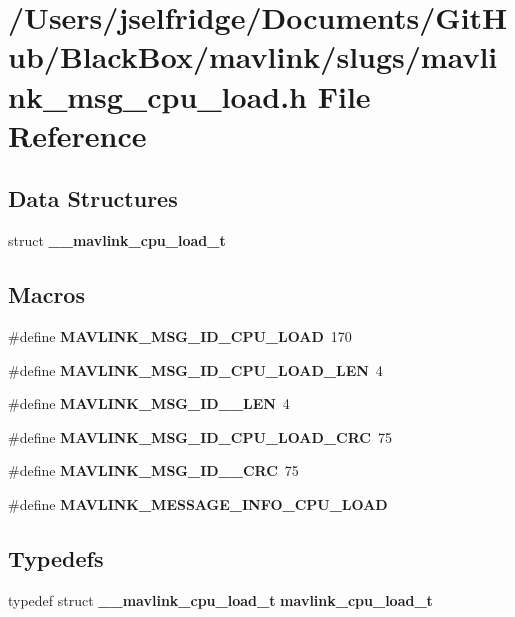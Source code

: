 \section{/\+Users/jselfridge/\+Documents/\+Git\+Hub/\+Black\+Box/mavlink/slugs/mavlink\+\_\+msg\+\_\+cpu\+\_\+load.h File Reference}
\label{mavlink__msg__cpu__load_8h}
\subsection*{Data Structures}
\begin{DoxyCompactItemize}
\item 
struct \textbf{ \+\_\+\+\_\+mavlink\+\_\+cpu\+\_\+load\+\_\+t}
\end{DoxyCompactItemize}
\subsection*{Macros}
\begin{DoxyCompactItemize}
\item 
\#define \textbf{ M\+A\+V\+L\+I\+N\+K\+\_\+\+M\+S\+G\+\_\+\+I\+D\+\_\+\+C\+P\+U\+\_\+\+L\+O\+AD}~170
\item 
\#define \textbf{ M\+A\+V\+L\+I\+N\+K\+\_\+\+M\+S\+G\+\_\+\+I\+D\+\_\+\+C\+P\+U\+\_\+\+L\+O\+A\+D\+\_\+\+L\+EN}~4
\item 
\#define \textbf{ M\+A\+V\+L\+I\+N\+K\+\_\+\+M\+S\+G\+\_\+\+I\+D\+\_\+\_\+\+L\+EN}~4
\item 
\#define \textbf{ M\+A\+V\+L\+I\+N\+K\+\_\+\+M\+S\+G\+\_\+\+I\+D\+\_\+\+C\+P\+U\+\_\+\+L\+O\+A\+D\+\_\+\+C\+RC}~75
\item 
\#define \textbf{ M\+A\+V\+L\+I\+N\+K\+\_\+\+M\+S\+G\+\_\+\+I\+D\+\_\+\_\+\+C\+RC}~75
\item 
\#define \textbf{ M\+A\+V\+L\+I\+N\+K\+\_\+\+M\+E\+S\+S\+A\+G\+E\+\_\+\+I\+N\+F\+O\+\_\+\+C\+P\+U\+\_\+\+L\+O\+AD}
\end{DoxyCompactItemize}
\subsection*{Typedefs}
\begin{DoxyCompactItemize}
\item 
typedef struct \textbf{ \+\_\+\+\_\+mavlink\+\_\+cpu\+\_\+load\+\_\+t} \textbf{ mavlink\+\_\+cpu\+\_\+load\+\_\+t}
\end{DoxyCompactItemize}


